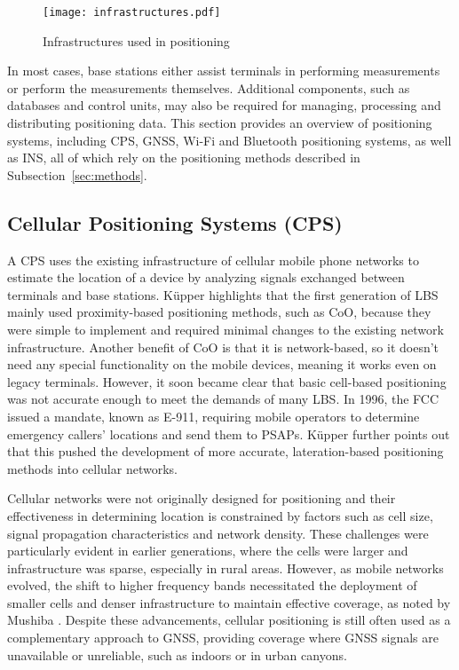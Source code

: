 \begin{figure}[htbp] 
    \centering 
    \texttt{[image: infrastructures.pdf]} 
    \caption{Infrastructures used in positioning \cite{kupper2005location}} 
    \label{fig:infrastructures} 
\end{figure}

In most cases, base stations either assist terminals in performing measurements or perform the measurements themselves. 
Additional components, such as databases and control units, may also be required for managing, processing and distributing positioning data. 
This section provides an overview of positioning systems, including \ac{CPS}, \ac{GNSS}, \acs{Wi-Fi} and Bluetooth positioning systems, as well as \acs{INS}, all of which rely on the positioning methods described in Subsection~\ref{sec:methods}.

\subsection{Cellular Positioning Systems (CPS)}
A \acs{CPS} uses the existing infrastructure of cellular mobile phone networks to estimate the location of a device by analyzing signals exchanged between terminals and base stations.
K\"upper \cite{kupper2005location} highlights that the first generation of \ac{LBS} mainly used proximity-based positioning methods, such as \acs{CoO}, because they were simple to implement and required minimal changes to the existing network infrastructure.
Another benefit of \acs{CoO} is that it is network-based, so it doesn't need any special functionality on the mobile devices, meaning it works even on legacy terminals.
However, it soon became clear that basic cell-based positioning was not accurate enough to meet the demands of many \acs{LBS}.
In 1996, the \ac{FCC} issued a mandate, known as \ac{E-911}, requiring mobile operators to determine emergency callers' locations and send them to \ac{PSAPs}.
K\"upper \cite{kupper2005location} further points out that this pushed the development of more accurate, lateration-based positioning methods into cellular networks.

Cellular networks were not originally designed for positioning and their effectiveness in determining location is constrained by factors such as cell size, signal propagation characteristics and network density. 
These challenges were particularly evident in earlier generations, where the cells were larger and infrastructure was sparse, especially in rural areas.
However, as mobile networks evolved, the shift to higher frequency bands necessitated the deployment of smaller cells and denser infrastructure to maintain effective coverage, as noted by Mushiba \cite{mushiba2024gsm}. 
Despite these advancements, cellular positioning is still often used as a complementary approach to \acs{GNSS}, providing coverage where \acs{GNSS} signals are unavailable or unreliable, such as indoors or in urban canyons.


